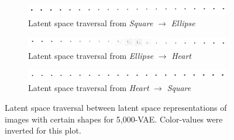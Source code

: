 \documentclass[11pt,a4paper]{article}
\begin{document}
\begin{figure}[H]
\centering
\begin{subfigure}{\textwidth}
\centering
\includegraphics[width=\textwidth]{images/latent_space_entanglement/vae_5000_traverse_square_ellipse.png}
\caption{Latent space traversal from \textit{Square} $\rightarrow$ \textit{Ellipse}}
\end{subfigure}
\begin{subfigure}{\textwidth}
\centering
\includegraphics[width=\textwidth]{images/latent_space_entanglement/vae_5000_traverse_ellipse_heart.png}
\caption{Latent space traversal from \textit{Ellipse} $\rightarrow$ \textit{Heart}}
\end{subfigure}
\begin{subfigure}{\textwidth}
\centering
\includegraphics[width=\textwidth]{images/latent_space_entanglement/vae_5000_traverse_heart_square.png}
\caption{Latent space traversal from \textit{Heart} $\rightarrow$ \textit{Square}}
\label{subfig:10000_vae_latent_space_traversal_heart_to_square}
\end{subfigure}
\caption[5,000-\ac{VAE} - Latent Space Traversal]{Latent space traversal between latent space representations of images with certain shapes for 5,000-\ac{VAE}. Color-values were inverted for this plot.}
\label{fig:5000_vae_latent_space_traversal_shape_to_shape}
\end{figure}

\pagebreak
\end{document}
